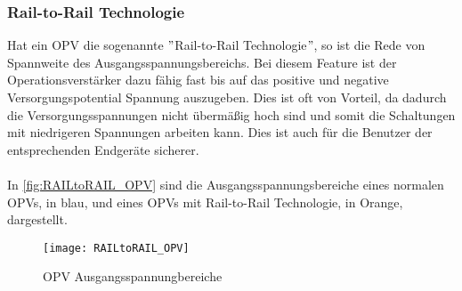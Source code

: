 \documentclass[titlepage,12pt,twoside]{article}
\begin{document}
\subsubsection{Rail-to-Rail Technologie}
Hat ein OPV die sogenannte $"$Rail-to-Rail Technologie$"$, so ist die Rede von Spannweite des Ausgangsspannungsbereichs. Bei diesem Feature
ist der Operationsverstärker dazu fähig fast bis auf das positive und negative Versorgungspotential Spannung auszugeben. Dies ist oft 
von Vorteil, da dadurch die Versorgungsspannungen nicht übermäßig hoch sind und somit die Schaltungen mit niedrigeren Spannungen arbeiten
kann. Dies ist auch für die Benutzer der entsprechenden Endgeräte sicherer.\\
\\
In \autoref{fig:RAILtoRAIL_OPV} sind die Ausgangsspannungsbereiche eines normalen OPVs, in blau, und eines OPVs mit Rail-to-Rail Technologie,
in Orange, dargestellt. \\
\begin{figure}[H]
	\begin{center}
		\scalebox{1.2}
		{\texttt{[image: RAILtoRAIL\_OPV]}}
		\caption{OPV Ausgangsspannungbereiche}
		\label{fig:RAILtoRAIL_OPV}
	\end{center}
\end{figure}
\end{document}
